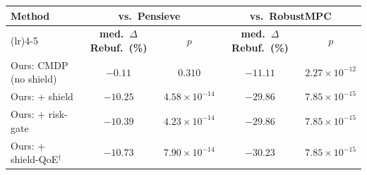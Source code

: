 \begin{tabularx}{\linewidth}{@{}>{\raggedright\arraybackslash}Xcccc@{}}
\toprule
\textbf{Method} & \multicolumn{2}{c}{\textbf{vs.\ Pensieve}} & \multicolumn{2}{c}{\textbf{vs.\ RobustMPC}} \\
\cmidrule(lr){2-3}\cmidrule(lr){4-5}
 & \textbf{med.\ $\Delta$Rebuf.\ (\%)} & \textbf{$p$} & \textbf{med.\ $\Delta$Rebuf.\ (\%)} & \textbf{$p$} \\
\midrule
Ours: CMDP (no shield) & $-0.11$ & $0.310$ & $-11.11$ & $2.27\times10^{-12}$ \\
Ours: + shield & $-10.25$ & $4.58\times10^{-14}$ & $-29.86$ & $7.85\times10^{-15}$ \\
Ours: + risk-gate & $-10.39$ & $4.23\times10^{-14}$ & $-29.86$ & $7.85\times10^{-15}$ \\
Ours: + shield-QoE$^{\dagger}$ & $-10.73$ & $7.90\times10^{-14}$ & $-30.23$ & $7.85\times10^{-15}$ \\
\bottomrule
\end{tabularx}
